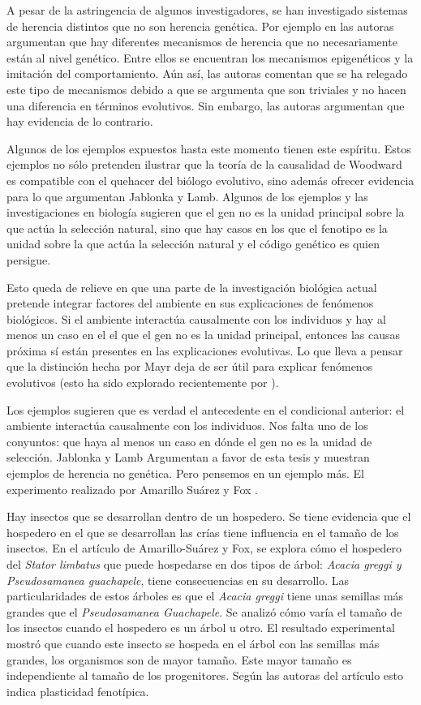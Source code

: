 A pesar de la astringencia de algunos investigadores, se han investigado sistemas de herencia distintos que no son herencia genética. Por ejemplo en \cite{Jablonka2020} las autoras argumentan que hay diferentes mecanismos de herencia que no necesariamente están al nivel genético. Entre ellos se encuentran los mecanismos epigenéticos y la imitación del comportamiento. Aún así, las autoras comentan que se ha relegado este tipo de mecanismos debido a que se argumenta que son triviales y no hacen una diferencia en términos evolutivos. Sin embargo, las autoras argumentan que hay evidencia de lo contrario.

Algunos de los ejemplos expuestos hasta este momento tienen este espíritu. Estos ejemplos no sólo pretenden ilustrar que la teoría de la causalidad de Woodward es compatible con el quehacer del biólogo evolutivo, sino además ofrecer evidencia para lo que argumentan Jablonka y Lamb. Algunos de los ejemplos y las investigaciones en biología sugieren que el gen no es la unidad principal sobre la que actúa la selección natural, sino que hay casos en los que el fenotipo es la unidad sobre la que actúa la selección natural y el código genético es quien persigue.

Esto queda de relieve en que una parte de la investigación biológica actual pretende integrar factores del ambiente en sus explicaciones de fenómenos biológicos. Si el ambiente interactúa causalmente con los individuos y hay al menos un caso en el el que el gen no es la unidad principal, entonces las causas próxima sí están presentes en las explicaciones evolutivas. Lo que lleva a pensar que la distinción hecha por Mayr deja de ser útil para explicar fenómenos evolutivos (esto ha sido explorado recientemente por \cite{Uller2020, Dayan2020, Laland2011}).

Los ejemplos sugieren que es verdad el antecedente en el condicional anterior: el ambiente interactúa causalmente con los individuos. Nos falta uno de los conyuntos: que haya al menos un caso en dónde el gen no es la unidad de selección. Jablonka y Lamb Argumentan a favor de esta tesis y muestran ejemplos de herencia no genética. Pero pensemos en un  ejemplo más. El experimento realizado por Amarillo Suárez y Fox \citeyear{Amarillo-Suarez2006}.

Hay insectos que se desarrollan dentro de un hospedero. Se tiene evidencia que el hospedero en el que se desarrollan las crías tiene influencia en el tamaño de los insectos. En el artículo de Amarillo-Suárez y Fox, se explora cómo el hospedero del \emph{Stator limbatus} que puede hospedarse en dos tipos de árbol: \emph{Acacia greggi y Pseudosamanea guachapele}, tiene consecuencias en su desarrollo. Las particularidades de estos árboles es que el \emph{Acacia greggi} tiene unas semillas más grandes que el \emph{Pseudosamanea Guachapele}. Se analizó cómo varía el tamaño de los insectos cuando el hospedero es un árbol u otro. El resultado experimental mostró que cuando este insecto se hospeda en el árbol con las semillas más grandes, los organismos son de mayor tamaño. Este mayor tamaño es independiente al tamaño de los progenitores. Según las autoras del artículo esto indica plasticidad fenotípica.

